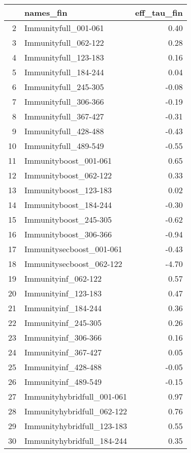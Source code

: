 \begin{table}[ht]
\centering
\begin{tabular}{rlr}
  \hline
 & names\_fin & eff\_tau\_fin \\ 
  \hline
2 & Immunityfull\_001-061 & 0.40 \\ 
  3 & Immunityfull\_062-122 & 0.28 \\ 
  4 & Immunityfull\_123-183 & 0.16 \\ 
  5 & Immunityfull\_184-244 & 0.04 \\ 
  6 & Immunityfull\_245-305 & -0.08 \\ 
  7 & Immunityfull\_306-366 & -0.19 \\ 
  8 & Immunityfull\_367-427 & -0.31 \\ 
  9 & Immunityfull\_428-488 & -0.43 \\ 
  10 & Immunityfull\_489-549 & -0.55 \\ 
  11 & Immunityboost\_001-061 & 0.65 \\ 
  12 & Immunityboost\_062-122 & 0.33 \\ 
  13 & Immunityboost\_123-183 & 0.02 \\ 
  14 & Immunityboost\_184-244 & -0.30 \\ 
  15 & Immunityboost\_245-305 & -0.62 \\ 
  16 & Immunityboost\_306-366 & -0.94 \\ 
  17 & Immunitysecboost\_001-061 & -0.43 \\ 
  18 & Immunitysecboost\_062-122 & -4.70 \\ 
  19 & Immunityinf\_062-122 & 0.57 \\ 
  20 & Immunityinf\_123-183 & 0.47 \\ 
  21 & Immunityinf\_184-244 & 0.36 \\ 
  22 & Immunityinf\_245-305 & 0.26 \\ 
  23 & Immunityinf\_306-366 & 0.16 \\ 
  24 & Immunityinf\_367-427 & 0.05 \\ 
  25 & Immunityinf\_428-488 & -0.05 \\ 
  26 & Immunityinf\_489-549 & -0.15 \\ 
  27 & Immunityhybridfull\_001-061 & 0.97 \\ 
  28 & Immunityhybridfull\_062-122 & 0.76 \\ 
  29 & Immunityhybridfull\_123-183 & 0.55 \\ 
  30 & Immunityhybridfull\_184-244 & 0.35 \\ 

\end{tabular}
\end{table}
